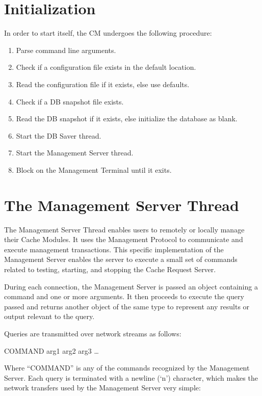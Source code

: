 \documentclass[letterpaper]{article}
\begin{document}
\section{Initialization}
In order to start itself, the CM undergoes the following procedure:

\begin{enumerate}
   \item Parse command line arguments.
   \item Check if a configuration file exists in the default location.
   \item Read the configuration file if it exists, else use defaults.
   \item Check if a DB snapshot file exists.
   \item Read the DB snapshot if it exists, else initialize the database as blank.
   \item Start the DB Saver thread.
   \item Start the Management Server thread.
   \item Block on the Management Terminal until it exits.
\end{enumerate}

\section{The Management Server Thread}
The Management Server Thread enables users to remotely or locally manage their Cache Modules. It uses the Management Protocol to communicate and execute management transactions. This specific implementation of the Management Server enables the server to execute a small set of commands related to testing, starting, and stopping the Cache Request Server.

During each connection, the Management Server is passed an object containing a command and one or more arguments. It then proceeds to execute the query passed and returns another object of the same type to represent any results or output relevant to the query.

Queries are transmitted over network streams as follows:
\\
\begin{addmargin}[1em]{2em}
COMMAND arg1 arg2 arg3 \ldots\\
\end{addmargin}

Where ``COMMAND'' is any of the commands recognized by the Management Server. Each query is terminated with a newline (`{\@backslashchar}n') character, which makes the network transfers used by the Management Server very simple:\\
\end{document}
